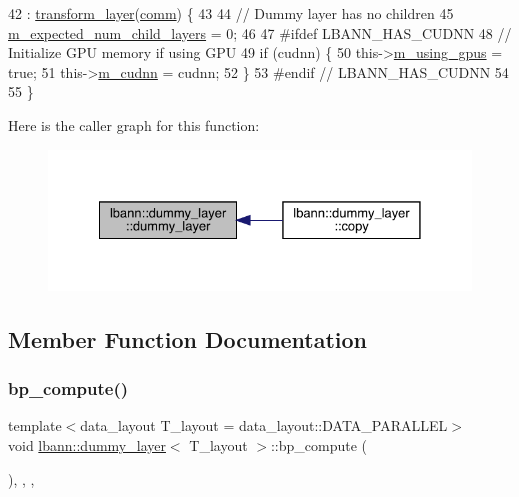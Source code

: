 \begin{DoxyCode}
42     : \hyperlink{classlbann_1_1transform__layer_a4b72501e0f4d0745c8b13c5331055e65}{transform\_layer}(\hyperlink{file__io_8cpp_ab048c6f9fcbcfaa57ce68b00263dbebe}{comm}) \{
43 
44     \textcolor{comment}{// Dummy layer has no children}
45     \hyperlink{classlbann_1_1Layer_ac08f133dddd150319650e220ab9a523a}{m\_expected\_num\_child\_layers} = 0;
46 
47 \textcolor{preprocessor}{  #ifdef LBANN\_HAS\_CUDNN}
48     \textcolor{comment}{// Initialize GPU memory if using GPU}
49     \textcolor{keywordflow}{if} (cudnn) \{
50       this->\hyperlink{classlbann_1_1Layer_af7881cb5eff5207c15fa835d65462e8f}{m\_using\_gpus} = \textcolor{keyword}{true};
51       this->\hyperlink{classlbann_1_1Layer_a08dbb94239e3b8c96329786c57c72e21}{m\_cudnn} = cudnn;
52     \}
53 \textcolor{preprocessor}{  #endif // LBANN\_HAS\_CUDNN}
54 
55   \}
\end{DoxyCode}
Here is the caller graph for this function\+:\nopagebreak
\begin{figure}[H]
\begin{center}
\leavevmode
\includegraphics[width=328pt]{classlbann_1_1dummy__layer_aed5bc546171348eaaf91aaf196406440_icgraph}
\end{center}
\end{figure}


\subsection{Member Function Documentation}
\mbox{\label{classlbann_1_1dummy__layer_a7d2a802a280bb93f2e07d0af88610335}} 
\subsubsection{\texorpdfstring{bp\+\_\+compute()}{bp\_compute()}}
{\footnotesize\ttfamily template$<$data\+\_\+layout T\+\_\+layout = data\+\_\+layout\+::\+D\+A\+T\+A\+\_\+\+P\+A\+R\+A\+L\+L\+EL$>$ \\
void \hyperlink{classlbann_1_1dummy__layer}{lbann\+::dummy\+\_\+layer}$<$ T\+\_\+layout $>$\+::bp\+\_\+compute (\begin{DoxyParamCaption}{ }\end{DoxyParamCaption})\hspace{0.3cm}{\ttfamily [inline]}, {\ttfamily [override]}, {\ttfamily [protected]}, {\ttfamily [virtual]}}

